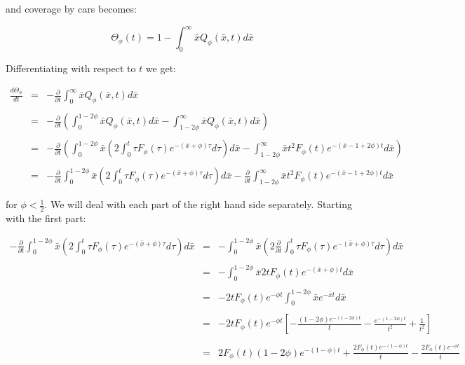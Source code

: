 and coverage by cars becomes: \bigskip

\[
	\Theta_{\phi}(t) = 1 - \int_{0}^{\infty} \bar{x} Q_{\phi}(\bar{x}, t) d\bar{x}
\]\medskip

Differentiating with respect to $t$ we get: \bigskip

\begin{eqnarray*}
	\frac{d \Theta_{\phi}}{dt} & = & -\frac{\partial}{\partial t} \int_{0}^{\infty} \bar{x} Q_{\phi}(\bar{x}, t) d\bar{x} \\\\
							   & = & -\frac{\partial}{\partial t} \left( \int_{0}^{1 - 2 \phi} \bar{x} Q_{\phi}(\bar{x}, t) d\bar{x} 
										- \int_{1 - 2 \phi}^{\infty} \bar{x} Q_{\phi}(\bar{x}, t) d\bar{x} \right) \\\\
							   & = & -\frac{\partial}{\partial t} \left( \int_{0}^{1 - 2 \phi} \bar{x} \left( 2 \int_{0}^{t} \tau F_{\phi}(\tau) e^{-(\bar{x} + \phi)\tau} d\tau \right) d\bar{x} 
										- \int_{1 - 2 \phi}^{\infty} \bar{x} t^2 F_{\phi}(t) e^{-(\bar{x} - 1 + 2 \phi)t} d\bar{x} \right) \\\\
							   & = & -\frac{\partial}{\partial t} \int_{0}^{1 - 2 \phi} \bar{x} \left( 2 \int_{0}^{t} \tau F_{\phi}(\tau) e^{-(\bar{x} + \phi)\tau} d\tau \right) d\bar{x} 
										- \frac{\partial}{\partial t} \int_{1 - 2 \phi}^{\infty} \bar{x} t^2 F_{\phi}(t) e^{-(\bar{x} - 1 + 2 \phi)t} d\bar{x} 
\end{eqnarray*}\medskip

for $\phi < \frac{1}{2}$. We will deal with each part of the right hand side separately. Starting with the first part: \bigskip

\begin{eqnarray*}
	-\frac{\partial}{\partial t} \int_{0}^{1 - 2 \phi} \bar{x} \left( 2 \int_{0}^{t} \tau F_{\phi}(\tau) e^{-(\bar{x} + \phi)\tau} d\tau \right) d\bar{x} & = & 
			-\int_{0}^{1 - 2 \phi} \bar{x} \left( 2 \frac{\partial}{\partial t} \int_{0}^{t} \tau F_{\phi}(\tau) e^{-(\bar{x} + \phi)\tau} d\tau \right) d\bar{x} \\\\
																																						  & = & 
			-\int_{0}^{1 - 2 \phi} \bar{x} 2 t F_{\phi}(t) e^{-(\bar{x} + \phi)t} d\bar{x} \\\\
																																						  & = & 
			-2 t F_{\phi}(t) e^{-\phi t} \int_{0}^{1 - 2 \phi} \bar{x} e^{-\bar{x} t} d\bar{x} \\\\
																																						  & = & 
			-2 t F_{\phi}(t) e^{-\phi t} \left[ - \frac{(1 - 2 \phi) e^{-(1 - 2 \phi)t}}{t} - \frac{e^{-(1 - 2 \phi)t}}{t^2} + \frac{1}{t^2} \right] \\\\
																																						  & = & 
			2 F_{\phi}(t) (1 - 2 \phi) e^{-(1 - \phi) t} + \frac{2 F_{\phi}(t) e^{-(1 - \phi)t}}{t} - \frac{2 F_{\phi}(t) e^{-\phi t}}{t}
\end{eqnarray*}\medskip

